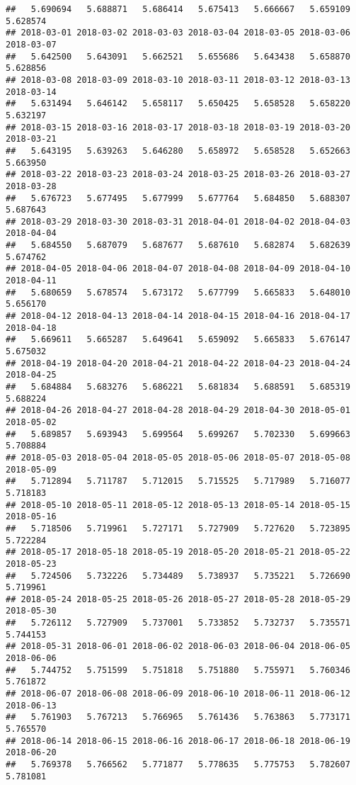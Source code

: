 \documentclass[
]{article}
\begin{document}
\begin{verbatim}
##   5.690694   5.688871   5.686414   5.675413   5.666667   5.659109   5.628574 
## 2018-03-01 2018-03-02 2018-03-03 2018-03-04 2018-03-05 2018-03-06 2018-03-07 
##   5.642500   5.643091   5.662521   5.655686   5.643438   5.658870   5.628856 
## 2018-03-08 2018-03-09 2018-03-10 2018-03-11 2018-03-12 2018-03-13 2018-03-14 
##   5.631494   5.646142   5.658117   5.650425   5.658528   5.658220   5.632197 
## 2018-03-15 2018-03-16 2018-03-17 2018-03-18 2018-03-19 2018-03-20 2018-03-21 
##   5.643195   5.639263   5.646280   5.658972   5.658528   5.652663   5.663950 
## 2018-03-22 2018-03-23 2018-03-24 2018-03-25 2018-03-26 2018-03-27 2018-03-28 
##   5.676723   5.677495   5.677999   5.677764   5.684850   5.688307   5.687643 
## 2018-03-29 2018-03-30 2018-03-31 2018-04-01 2018-04-02 2018-04-03 2018-04-04 
##   5.684550   5.687079   5.687677   5.687610   5.682874   5.682639   5.674762 
## 2018-04-05 2018-04-06 2018-04-07 2018-04-08 2018-04-09 2018-04-10 2018-04-11 
##   5.680659   5.678574   5.673172   5.677799   5.665833   5.648010   5.656170 
## 2018-04-12 2018-04-13 2018-04-14 2018-04-15 2018-04-16 2018-04-17 2018-04-18 
##   5.669611   5.665287   5.649641   5.659092   5.665833   5.676147   5.675032 
## 2018-04-19 2018-04-20 2018-04-21 2018-04-22 2018-04-23 2018-04-24 2018-04-25 
##   5.684884   5.683276   5.686221   5.681834   5.688591   5.685319   5.688224 
## 2018-04-26 2018-04-27 2018-04-28 2018-04-29 2018-04-30 2018-05-01 2018-05-02 
##   5.689857   5.693943   5.699564   5.699267   5.702330   5.699663   5.708884 
## 2018-05-03 2018-05-04 2018-05-05 2018-05-06 2018-05-07 2018-05-08 2018-05-09 
##   5.712894   5.711787   5.712015   5.715525   5.717989   5.716077   5.718183 
## 2018-05-10 2018-05-11 2018-05-12 2018-05-13 2018-05-14 2018-05-15 2018-05-16 
##   5.718506   5.719961   5.727171   5.727909   5.727620   5.723895   5.722284 
## 2018-05-17 2018-05-18 2018-05-19 2018-05-20 2018-05-21 2018-05-22 2018-05-23 
##   5.724506   5.732226   5.734489   5.738937   5.735221   5.726690   5.719961 
## 2018-05-24 2018-05-25 2018-05-26 2018-05-27 2018-05-28 2018-05-29 2018-05-30 
##   5.726112   5.727909   5.737001   5.733852   5.732737   5.735571   5.744153 
## 2018-05-31 2018-06-01 2018-06-02 2018-06-03 2018-06-04 2018-06-05 2018-06-06 
##   5.744752   5.751599   5.751818   5.751880   5.755971   5.760346   5.761872 
## 2018-06-07 2018-06-08 2018-06-09 2018-06-10 2018-06-11 2018-06-12 2018-06-13 
##   5.761903   5.767213   5.766965   5.761436   5.763863   5.773171   5.765570 
## 2018-06-14 2018-06-15 2018-06-16 2018-06-17 2018-06-18 2018-06-19 2018-06-20 
##   5.769378   5.766562   5.771877   5.778635   5.775753   5.782607   5.781081 

\end{verbatim}
\end{document}
